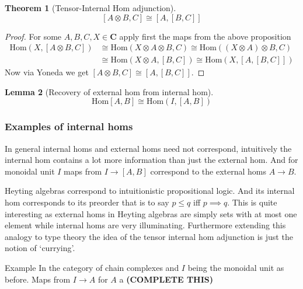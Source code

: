 \documentclass[12pt]{article}
\numberwithin{equation}{section}
\newcommand{\Hom}{{\mathrm{Hom}}}
\newtheorem{theorem}{Theorem}[section]
\newtheorem{lemma}[theorem]{Lemma}
\begin{document}
\begin{appendices}
		
		\begin{theorem}[Tensor-Internal Hom adjunction]\label{tensorinternalhom}
			\[ [A\otimes B, C] \cong [A, [B,C]] \]
		\end{theorem}
		\begin{proof}
			For some $A,B,C,X \in \mathbf{C}$ apply first the maps from the above proposition 
			\begin{align*}
				\Hom(X,[A\otimes B, C]) &\cong \Hom (X \otimes A \otimes B, C)
				 \cong \Hom((X \otimes A)\otimes B, C) \\&\cong \Hom(X \otimes A, [B,C]) \cong \Hom(X,[A,[B,C]])
			\end{align*}
			Now via Yoneda we get $[A \otimes B, C] \cong [A, [B,C]]$.
		\end{proof}
		
		\begin{lemma}[Recovery of external hom from internal hom]
			\[ \Hom[A,B]\cong \Hom(I,[A,B]) \]
		\end{lemma}
		
		\subsubsection{Examples of internal homs}
		In general internal homs and external homs need not correspond, intuitively the internal hom contains a lot more information than just the external hom. And for monoidal unit $I$ maps from $I \to [A,B]$ correspond to the external homs $A \to B$.
		
		Heyting algebras correspond to intuitionistic propositional logic. And its internal hom corresponds to its preorder that is to say $p \leq q $ iff $  p \implies q$. This is quite interesting as external homs in Heyting algebras are simply sets with at most one element while internal homs are very illuminating. Furthermore extending this analogy to type theory the idea of the tensor internal hom adjunction is just the notion of `currying'.
		
		Example In the category of chain complexes and $I$ being the monoidal unit as before. Maps from $I \to A$ for $A$ a \textbf{(COMPLETE THIS)}
		

\end{appendices}
\end{document}
